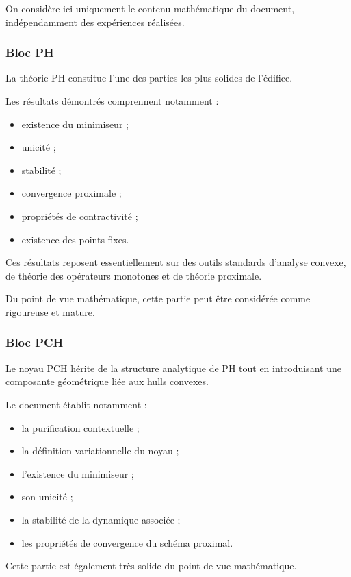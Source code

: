 On considère ici uniquement le contenu mathématique du document, indépendamment des expériences réalisées.

\subsubsection{Bloc PH}

La théorie PH constitue l'une des parties les plus solides de l'édifice.

Les résultats démontrés comprennent notamment :

\begin{itemize}
    \item existence du minimiseur ;
    \item unicité ;
    \item stabilité ;
    \item convergence proximale ;
    \item propriétés de contractivité ;
    \item existence des points fixes.
\end{itemize}

Ces résultats reposent essentiellement sur des outils standards d'analyse convexe, de théorie des opérateurs monotones et de théorie proximale.

Du point de vue mathématique, cette partie peut être considérée comme rigoureuse et mature.

\subsubsection{Bloc PCH}

Le noyau PCH hérite de la structure analytique de PH tout en introduisant une composante géométrique liée aux hulls convexes.

Le document établit notamment :

\begin{itemize}
    \item la purification contextuelle ;
    \item la définition variationnelle du noyau ;
    \item l'existence du minimiseur ;
    \item son unicité ;
    \item la stabilité de la dynamique associée ;
    \item les propriétés de convergence du schéma proximal.
\end{itemize}

Cette partie est également très solide du point de vue mathématique.

